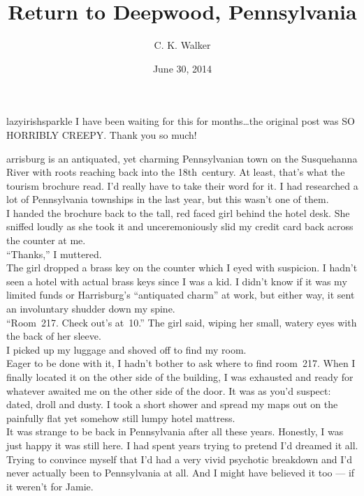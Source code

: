 \documentclass[a5paper]{scrartcl}
\title{Return to Deepwood, Pennsylvania}
\author{C. K. Walker}
\date{June 30, 2014}
\begin{document}
\maketitle

\begin{shadequote}[l]{lazyirishsparkle}
I have been waiting for this for months\dots the original post was SO HORRIBLY CREEPY. Thank you so much!
\end{shadequote}
\clearpage

arrisburg is an antiquated, yet charming Pennsylvanian town on the Susquehanna River with roots reaching back into the 18th~century. At least, that's what the tourism brochure read. I'd really have to take their word for it.  I had researched a lot of Pennsylvania townships in the last year, but this wasn't one of them.\\


I handed the brochure back to the tall, red faced girl behind the hotel desk. She sniffed loudly as she took it and unceremoniously slid my credit card back across the counter at me.\\


\enquote{Thanks,} I muttered.\\


The girl dropped a brass key on the counter which I eyed with suspicion. I hadn't seen a hotel with actual brass keys since I was a kid. I didn't know if it was my limited funds or Harrisburg's \enquote{antiquated charm} at work, but either way, it sent an involuntary shudder down my spine.\\


\enquote{Room~217. Check out's at~10.} The girl said, wiping her small, watery eyes with the back of her sleeve.\\


I picked up my luggage and shoved off to find my room. \\


Eager to be done with it, I hadn't bother to ask where to find room~217. When I finally located it on the other side of the building, I was exhausted and ready for whatever awaited me on the other side of the door. It was as you'd suspect: dated, droll and dusty. I took a short shower and spread my maps out on the painfully flat yet somehow still lumpy hotel mattress.\\


It was strange to be back in Pennsylvania after all these years. Honestly, I was just happy it was still here. I had spent years trying to pretend I'd dreamed it all. Trying to convince myself that I'd had a very vivid psychotic breakdown and I'd never actually been to Pennsylvania at all. And I might have believed it too --- if it weren't for Jamie.\\
\end{document}
